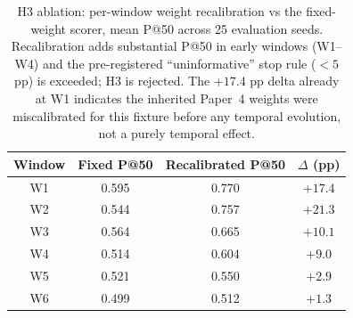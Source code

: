 \begin{table}[t]
\centering
\caption{H3 ablation: per-window weight recalibration vs the fixed-weight scorer, mean P@50 across 25 evaluation seeds. Recalibration adds substantial P@50 in early windows (W1--W4) and the pre-registered ``uninformative'' stop rule ($<\!5$ pp) is exceeded; H3 is rejected. The $+17.4$ pp delta already at W1 indicates the inherited Paper~4 weights were miscalibrated for this fixture before any temporal evolution, not a purely temporal effect.}
\label{tab:recalibration}
\setlength{\tabcolsep}{4pt}
\small
\begin{tabular}{cccc}
\toprule
Window & Fixed P@50 & Recalibrated P@50 & $\Delta$ (pp) \\
\midrule
W1 & 0.595 & 0.770 & $+17.4$ \\
W2 & 0.544 & 0.757 & $+21.3$ \\
W3 & 0.564 & 0.665 & $+10.1$ \\
W4 & 0.514 & 0.604 & $+9.0$ \\
W5 & 0.521 & 0.550 & $+2.9$ \\
W6 & 0.499 & 0.512 & $+1.3$ \\
\bottomrule
\end{tabular}
\end{table}
